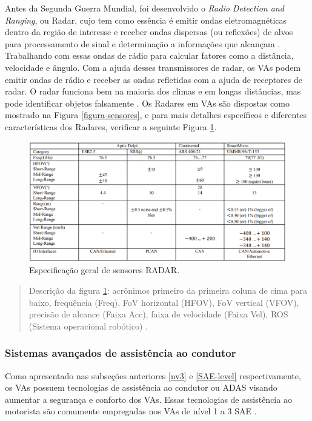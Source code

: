 Antes da Segunda Guerra Mundial, foi desenvolvido o \textit{Radio Detection and Ranging}, ou Radar, cujo tem como essência é emitir ondas eletromagnéticas dentro da região de interesse e receber ondas dispersas (ou reflexões) de alvos para processamento de sinal e determinação a informações que alcançam \cite{sensors}. Trabalhando com essas ondas de rádio para calcular fatores como a distância, velocidade e ângulo. Com a ajuda desses transmissores de radar, os VAs podem emitir ondas de rádio e receber as ondas refletidas com a ajuda de receptores de radar. O radar funciona bem na maioria dos climas e em longas distâncias, mas pode identificar objetos falsamente \cite{review-auto}.
Os Radares em VAs são dispostas como mostrado na Figura \ref{figura-sensores}, e para mais detalhes específicos e diferentes características dos Radares, verificar a seguinte Figura \ref{tabela-radar}.
\begin{figure}[H]
\centering
\includegraphics[width=\textwidth]{Figures/radar-table.png}
\caption{Especificação geral de sensores RADAR.}
\label{tabela-radar}
\end{figure}

\begin{quote}
Descrição da figura \ref{tabela-radar}: acrônimos primeiro da primeira coluna de cima para baixo, frequência (Freq), FoV horizontal (HFOV), FoV vertical (VFOV), precisão de alcance (Faixa Acc), faixa de velocidade (Faixa Vel), ROS (Sistema operacional robótico) \cite{sensors}.
\end{quote}

\subsubsection{Sistemas avançados de assistência ao condutor} \label{adas}
Como apresentado nas subseções anteriores \ref{nv3} e \ref{SAE-level} respectivamente, os VAs possuem tecnologias de assistência ao condutor ou ADAS visando aumentar a segurança e conforto dos VAs. Essas tecnologias de assistência ao motorista são comumente empregadas nos VAs de nível 1 a 3 SAE \cite{SAE}.

